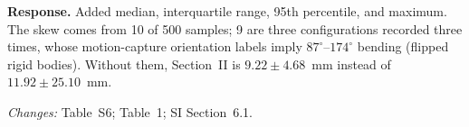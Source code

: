 \textbf{Response.} Added median, interquartile range, 95th percentile, and maximum. The skew comes from 10 of 500 samples; 9 are three configurations recorded three times, whose motion-capture orientation labels imply $87^\circ$--$174^\circ$ bending (flipped rigid bodies). Without them, Section~II is $9.22 \pm 4.68$~mm instead of $11.92 \pm 25.10$~mm.

\textit{Changes:} Table~S6; Table~1; SI Section~6.1.
